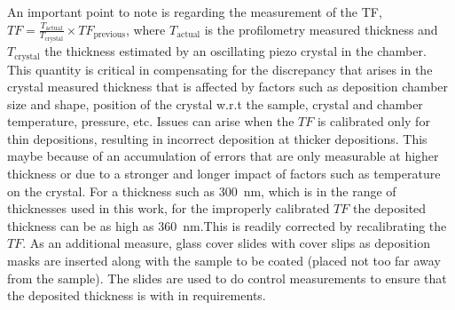 An important point to note is regarding the measurement of the \gls{TF}, $TF = \frac{T_{\text{actual}}}{T_{\text{crystal}}} \times TF_{\text{previous}}$, where $T_{\text{actual}}$ is the profilometry measured thickness and $T_{\text{crystal}}$ the thickness estimated by an oscillating piezo crystal in the chamber. This quantity is critical in compensating for the discrepancy that arises in the crystal measured thickness that is affected by factors such as deposition chamber size and shape, position of the crystal w.r.t the sample, crystal and chamber temperature, pressure, etc. Issues can arise when the $TF$ is calibrated only for thin depositions, resulting in incorrect deposition at thicker depositions. This maybe because of an accumulation of errors that are only measurable at higher thickness or due to a stronger and longer impact of factors such as temperature on the crystal. For a thickness such as \qty{300}{\nano\meter}, which is in the range of thicknesses used in this work, for the improperly calibrated $TF$ the deposited thickness can be as high as \qty{360}{\nano\meter}.\footnotemark{}This is readily corrected by recalibrating the $TF$. As an additional measure, glass cover slides with cover slips as deposition masks are inserted along with the sample to be coated (placed not too far away from the sample). The slides are used to do control measurements to ensure that the deposited thickness is with in requirements.
